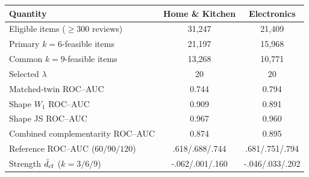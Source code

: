 \begin{tabular}{lcc}
\toprule
Quantity & Home \& Kitchen & Electronics \\
\midrule
Eligible items ($\ge 300$ reviews) & 31,247 & 21,409 \\
Primary $k=6$-feasible items & 21,197 & 15,968 \\
Common $k=9$-feasible items & 13,268 & 10,771 \\
Selected $\lambda$ & 20 & 20 \\
Matched-twin ROC--AUC & 0.744 & 0.794 \\
Shape $W_1$ ROC--AUC & 0.909 & 0.891 \\
Shape JS ROC--AUC & 0.967 & 0.960 \\
Combined complementarity ROC--AUC & 0.874 & 0.895 \\
Reference ROC--AUC ($60/90/120$) & .618/.688/.744 & .681/.751/.794 \\
Strength $\bar d_{\rm cf}$ ($k=3/6/9$) & -.062/.001/.160 & -.046/.033/.202 \\
\bottomrule
\end{tabular}
